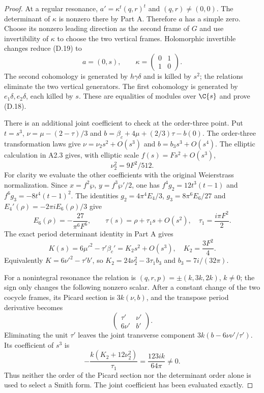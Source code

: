 \begin{proof}
At a regular resonance, $a'=\kappa^t(q,r)^t$ and
$(q,r)\ne(0,0)$. The determinant of $\kappa$ is nonzero there by
Part A. Therefore $a$ has a simple zero. Choose its nonzero leading
direction as the second frame of $G$ and use invertibility of
$\kappa$ to choose the two vertical frames. Holomorphic invertible
changes reduce (D.19) to
\[
 a=(0,s),\qquad \kappa=\begin{pmatrix}0&1\\1&0\end{pmatrix}. \tag{D.21}
\]
The second cohomology is generated by $h\gamma\delta$ and is killed
by $s^2$; the relations eliminate the two vertical generators.
The first cohomology is generated by $e_1\delta,e_2\delta$, each
killed by $s$. These are equalities of modules over $\C\{s\}$
and prove (D.18).

There is an additional joint coefficient to check at the order-three
point. Put $t=s^3$, $\nu=\mu-(2-\tau)/3$ and
$b=\beta_c+4\mu+(2/3)\tau-b(0)$. The order-three transformation
laws give $\nu=\nu_2s^2+O(s^3)$ and $b=b_3s^3+O(s^4)$.
The elliptic calculation in A2.3 gives, with elliptic scale
$f(s)=F s^2+O(s^3)$,
\[
 \nu_2^2=9F^2/512.
\]
For clarity we evaluate the other coefficients with the original
Weierstrass normalization. Since $x=f^2\wp$,
$y=f^3\wp'/2$, one has
$f^4g_2=12t^3(t-1)$ and $f^6g_3=-8t^4(t-1)^2$.
The identities $g_2=4\pi^4E_4/3$, $g_3=8\pi^6E_6/27$ and
$E_4'(\rho)=-2\pi iE_6(\rho)/3$ give
\[
 E_6(\rho)=-\frac{27}{\pi^6F^6},\qquad
 \tau(s)=\rho+\tau_1s+O(s^2),\quad \tau_1=\frac{i\pi F^2}{2}.
\]
The exact period determinant identity in Part A gives
\[
 K(s)=6\mu'^2-\tau'\beta_c'=K_2s^2+O(s^3),
 \quad K_2=\frac{3F^2}{4}.
\]
Equivalently $K=6\nu'^2-\tau'b'$, so
$K_2=24\nu_2^2-3\tau_1b_3$ and $b_3=7i/(32\pi)$.

For a nonintegral resonance the relation is
$(q,r,p)=\pm(k,3k,2k)$, $k\ne0$; the sign only changes the
following nonzero scalar. After a constant change of the two
cocycle frames, its Picard section is $3k(\nu,b)$, and the
transpose period derivative becomes
\[
 \begin{pmatrix}\tau'&\nu'\\6\nu'&b'\end{pmatrix}.
\]
Eliminating the unit $\tau'$ leaves the joint transverse component
$3k(b-6\nu\nu'/\tau')$. Its coefficient of $s^3$ is
\[
 -\frac{k(K_2+12\nu_2^2)}{\tau_1}
       =\frac{123ik}{64\pi}\ne0.                      \tag{D.22}
\]
Thus neither the order of the Picard section nor the determinant
order alone is used to select a Smith form. The joint coefficient
has been evaluated exactly.


\end{proof}
